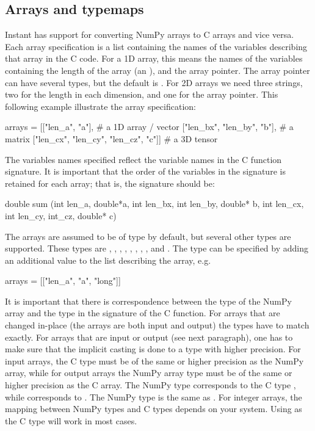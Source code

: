 \subsection{Arrays and typemaps}\label{wilbers:sec:arrays}

Instant has support for converting NumPy arrays to C arrays and vice
versa. Each array specification is a list containing the names of the
variables describing that array in the C code. For a 1D array, this
means the names of the variables containing the length of the array
(an ), and the array pointer. The array pointer can have
several types, but the default is . For 2D arrays we need
three strings, two for the length in each dimension, and one for the
array pointer. This following example illustrate the array
specification:
\begin{python}
arrays = [["len_a", "a"],                      # a 1D array / vector
          ["len_bx", "len_by", "b"],           # a matrix
          ["len_cx", "len_cy", "len_cz", "c"]] # a 3D tensor
\end{python}
The variables names specified reflect the variable names in the C function
signature. It is important that the order of the variables in the signature is
retained for each array; that is, the signature should be:
\begin{c++}
double sum (int len_a, double*a,
	          int len_bx, int len_by, double* b,
	          int len_cx, int len_cy, int_cz, double* c)
\end{c++}
The arrays are assumed to be of type  by default, but
several other types are supported. These types
are , , , , , , , ,
and . The type can be specified by adding an
additional value to the list describing the array, e.g.
\begin{python}
arrays = [["len_a", "a", "long"]]
\end{python}
It is important that there is correspondence between the type of the
NumPy array and the type in the signature of the C function. For
arrays that are changed in-place (the arrays are both
input and output) the types have to match exactly. For
arrays that are input or output (see next paragraph), one has to make
sure that the implicit casting is done to a type with higher
precision. For input arrays, the C type must be of the same or higher
precision as the NumPy array, while for output arrays the NumPy array
type must be of the same or higher precision as the C array. The
NumPy type  corresponds to the C type ,
while  corresponds to . The NumPy
type  is the same as . For integer arrays, the
mapping between NumPy types and C types depends on your
system. Using  as the C type will work in most cases.

